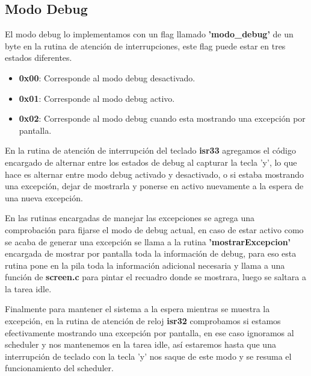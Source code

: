 \subsection{Modo Debug}

El modo debug lo implementamos con un flag llamado \textbf{'modo_debug'} de un byte en la rutina de atención de interrupciones, este flag puede estar en tres estados diferentes.

\begin{itemize}
\item \textbf{0x00}: Corresponde al modo debug desactivado.
\item \textbf{0x01}: Corresponde al modo debug activo.
\item \textbf{0x02}: Corresponde al modo debug cuando esta mostrando una excepción por pantalla.
\end{itemize}

En la rutina de atención de interrupción del teclado \textbf{isr33} agregamos el código encargado de alternar entre los estados de debug al capturar la tecla 'y', lo que hace es alternar entre modo debug activado y desactivado, o si estaba mostrando una excepción, dejar de mostrarla y ponerse en activo nuevamente a la espera de una nueva excepción.
\vspace{0.25cm}

En las rutinas encargadas de manejar las excepciones se agrega una comprobación para fijarse el modo de debug actual, en caso de estar activo como se acaba de generar una excepción se llama a la rutina \textbf{'mostrarExcepcion'} encargada de mostrar por pantalla toda la información de debug, para eso esta rutina pone en la pila toda la información adicional necesaria y llama a una función de \textbf{screen.c} para pintar el recuadro donde se mostrara, luego se saltara a la tarea idle.
\vspace{0.25cm}

Finalmente para mantener el sistema a la espera mientras se muestra la excepción, en la rutina de atención de reloj \textbf{isr32} comprobamos si estamos efectivamente mostrando una excepción por pantalla, en ese caso ignoramos al scheduler y nos mantenemos en la tarea idle, así estaremos hasta que una interrupción de teclado con la tecla 'y' nos saque de este modo y se resuma el funcionamiento del scheduler.